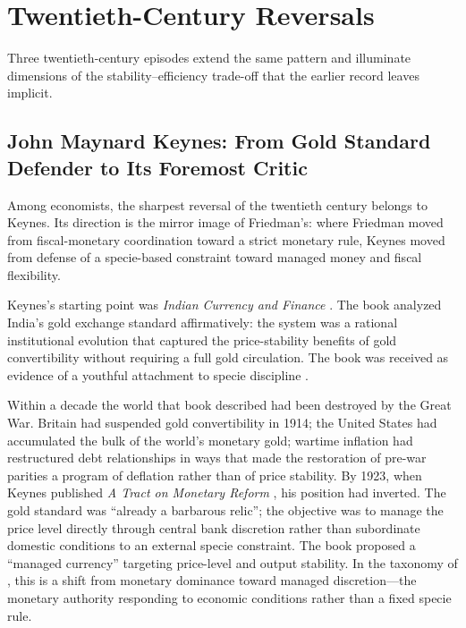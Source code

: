 \documentclass[12pt]{article}
\begin{document}
\section{Twentieth-Century Reversals}
\label{sec:twentieth}

Three twentieth-century episodes extend the same pattern and illuminate
dimensions of the stability--efficiency trade-off that the earlier
record leaves implicit.

\subsection{John Maynard Keynes: From Gold Standard Defender to
             Its Foremost Critic}

Among economists, the sharpest reversal of the twentieth century belongs
to Keynes.  Its direction is the mirror image of Friedman's: where
Friedman moved from fiscal-monetary coordination toward a strict
monetary rule, Keynes moved from defense of a specie-based constraint
toward managed money and fiscal flexibility.

Keynes's starting point was \textit{Indian Currency and Finance}
\citep{Keynes1913}.  The book analyzed India's gold exchange standard
affirmatively: the system was a rational institutional evolution that
captured the price-stability benefits of gold convertibility without
requiring a full gold circulation.  The book was received as evidence
of a youthful attachment to specie discipline \citep{Moggridge1992}.

Within a decade the world that book described had been destroyed by the
Great War.  Britain had suspended gold convertibility in 1914; the United
States had accumulated the bulk of the world's monetary gold; wartime
inflation had restructured debt relationships in ways that made the
restoration of pre-war parities a program of deflation rather than of
price stability.  By 1923, when Keynes published \textit{A Tract on Monetary Reform}
\citep{Keynes1923}, his position had inverted.  The gold standard was
``already a barbarous relic''; the objective was to manage the price
level directly through central bank discretion rather than subordinate
domestic conditions to an external specie constraint.  The book proposed
a ``managed currency'' targeting price-level and output stability.  In
the taxonomy of \citet{Sargent2011}, this is a shift from monetary
dominance toward managed discretion---the monetary authority responding
to economic conditions rather than a fixed specie rule.
\end{document}
